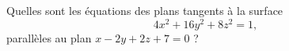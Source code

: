 
\begin{exercice}\label{exoImplicite0007}

Quelles sont les équations des plans tangents à la surface 
\[
4x^2+16y^2+8z^2=1,
\]
parallèles au plan $x-2y+2z+7=0$ ?

\end{exercice}
